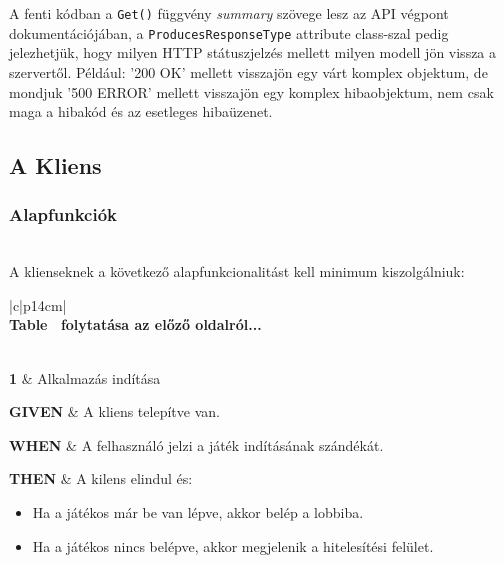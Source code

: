 \documentclass[twoside, a4paper, 12pt]{article}
\begin{document}
A fenti kódban a \texttt{Get()} függvény \textit{summary} szövege lesz az API végpont dokumentációjában, a \texttt{ProducesResponseType} attribute class-szal pedig jelezhetjük, hogy milyen HTTP státuszjelzés mellett milyen modell jön vissza a szervertől. Például: '200 OK' mellett visszajön egy várt komplex objektum, de mondjuk '500 ERROR' mellett visszajön egy komplex hibaobjektum, nem csak maga a hibakód és az esetleges hibaüzenet.


\subsection{A Kliens}

\subsubsection{Alapfunkciók} \mbox{} \\
A klienseknek a következő alapfunkcionalitást kell minimum kiszolgálniuk:

\begin{longtable}[c]{|c|p{14cm}|}
	\hline
	\rowcolor[HTML]{6665CD}
	 \\ \hline
	\endfirsthead
	\multicolumn{2}{c}%
	{{\bfseries Table \thetable\ folytatása az előző oldalról...}} \\
	\hline
	 \\ \hline
	\endhead
	\rowcolor[HTML]{CBCEFB} 
	
	\textbf{1}
	&	Alkalmazás indítása
	\\ \nobreakhline
	
	\textbf{GIVEN} &
	A kliens telepítve van.
	\\ \nobreakhline
	
	\textbf{WHEN} &
	A felhasználó jelzi a játék indításának szándékát.
	\\
	\nobreakhline
	
	\textbf{THEN} &
	A kilens elindul és:
	\begin{itemize}
		\item Ha a játékos már be van lépve, akkor belép a lobbiba.
		\item Ha a játékos nincs belépve, akkor megjelenik a hitelesítési felület.
	\end{itemize} 
	\\
	\hline
	
	\caption{Kliens alapfunkciói - indítás}
	\label{userStories:client:start}\\
\end{longtable} 
\end{document}
